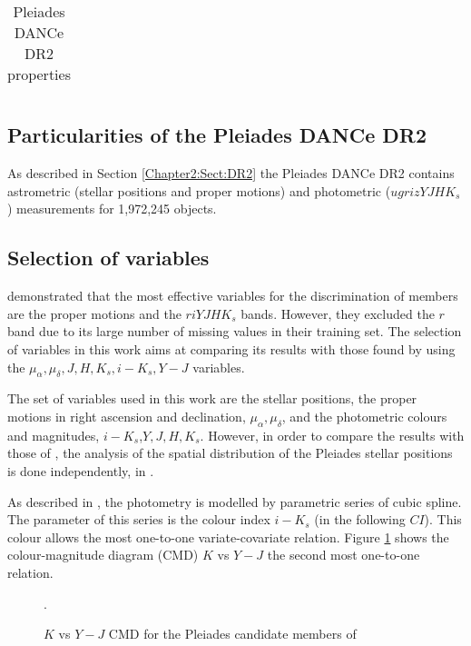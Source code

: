 \begin{table}[htdp]
\caption{Pleiades DANCe DR2 properties}
\begin{center}
\begin{tabular}{|c|c|}

\end{tabular}
\end{center}
\label{tab:DR2properties}
\end{table}%
\subsection{Particularities of the Pleiades DANCe DR2}
As described in Section \ref{Chapter2:Sect:DR2} the Pleiades DANCe DR2 contains astrometric (stellar positions and proper motions) and photometric ($ugrizYJHK_s$) measurements for 1,972,245 objects. 



\subsection{Selection of variables}
\citet{Sarro2014} demonstrated that the most effective variables for the discrimination of members are the proper motions and the $riYJHK_s$ bands. However, they excluded the $r$ band due to its large number of missing values in their training set. The selection of variables in this work aims at comparing its results with those found by \citet{Bouy2015} using the $\mu_{\alpha},\mu_{\delta},J,H,K_s,i-K_s,Y-J$ variables. 

The set of variables used in this work are the stellar positions, the proper motions in right ascension and declination, $\mu_{\alpha},\mu_{\delta}$, and the photometric colours and magnitudes, $i-K_s$,$Y,J,H,K_s$. However, in order to compare the results with those of \citet{Bouy2015}, the analysis of the spatial distribution of the Pleiades stellar positions is done independently, in \citet{Olivares2017b}.

As described in \citet{Olivares2017}, the photometry is modelled by parametric series of cubic spline. The parameter of this series is the colour index $i-K_s$ (in the following $CI$). This colour allows the most one-to-one variate-covariate relation. Figure \ref{fig:otherCI} shows the colour-magnitude diagram (CMD) $K$ vs $Y-J$ the second most one-to-one relation.


\begin{figure}[htbp]
\begin{center}
\caption{$K$ vs $Y-J$ CMD for the Pleiades candidate members of \citet{Bouy2015}}.
\label{fig:otherCI}
\end{center}
\end{figure}

